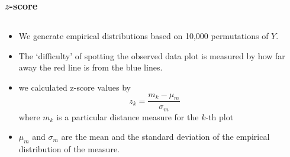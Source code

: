\documentclass{beamer}
\begin{document}
\begin{frame}
\frametitle{$z$-score}
	\begin{columns}

	\begin{column}{0.55\textwidth}
		\begin{itemize}
		\item We generate empirical distributions based on 10,000 permutations of $Y$.
		\item The `difficulty' of spotting the observed data plot is measured by how far away the red 		line is from the blue lines.
		\item we calculated z-score values by
		$$z_k = \frac{m_k - \mu_m}{\sigma_m}$$
		where $m_k$ is a particular distance measure for the $k$-th plot
		\item  $\mu_m$ and $\sigma_m$ are the mean and the standard deviation of the empirical 		distribution of the measure.
		\end{itemize}
	\end{column}

	\begin{column}{0.45\textwidth}
		 \begin{center}
		 \end{center}
	\end{column}
\end{columns}
\end{frame}
\end{document}
